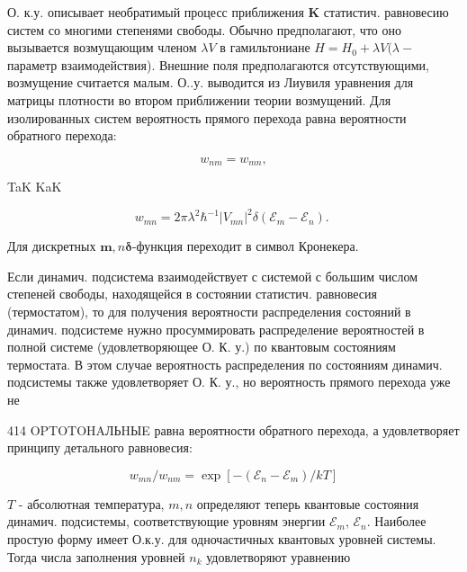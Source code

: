 \documentclass[10pt]{article}
\begin{document}
О. к.у. описывает необратимый процесс приближения $\mathbf{K}$ статистич. равновесию систем со многими степенями свободы. Обычно предполагают, что оно вызывается возмущающим членом $\lambda V$ в гамильтониане $H=H_{0}+\lambda V(\lambda-$ параметр взаимодействия). Внешние поля предполагаются отсутствующими, возмущение считается малым. О..у. выводится из Лиувиля уравнения для матрицы плотности во втором приближении теории возмущений. Для изолированных систем вероятность прямого перехода равна вероятности обратного перехода:



\[

w_{n m}=w_{m n},

\]



TaK KaK



\[

w_{m n}=2 \pi \lambda^{2} \hbar^{-1}\left|V_{m n}\right|^{2} \delta\left(\mathscr{E}_{m}-\mathscr{E}_{n}\right) \text {. }

\]



Для дискретных $\boldsymbol{m}, n \boldsymbol{\delta}$-функция переходит в символ Кронекера.



Если динамич. подсистема взаимодействует с системой с большим числом степеней свободы, находящейся в состоянии статистич. равновесия (термостатом), то для получения вероятности распределения состояний в динамич. подсистеме нужно просуммировать распределение вероятностей в полной системе (удовлетворяющее О. К. у.) по квантовым состояниям термостата. В этом случае вероятность распределения по состояниям динамич. подсистемы также удовлетворяет О. К. у., но вероятность прямого перехода уже не



414 OPTOTOHAЛЬHЫE равна вероятности обратного перехода, а удовлетворяет принципу детального равновесия:



\[

w_{m n} / w_{n m}=\exp \left[-\left(\mathscr{E}_{n}-\mathscr{E}_{m}\right) / k T\right]

\]



$T$ - абсолютная температура, $m, n$ определяют теперь квантовые состояния динамич. подсистемы, соответствующие уровням энергии $\mathscr{E}_{m}$, $\mathscr{E}_{n}$. Наиболее простую форму имеет О.к.у. для одночастичных квантовых уровней системы. Тогда числа заполнения уровней $n_{k}$ удовлетворяют уравнению
\end{document}
